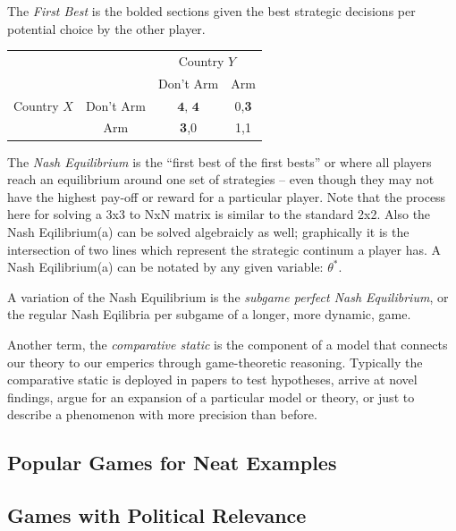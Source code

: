\documentclass[12pt]{article}\usepackage[]{graphicx}\usepackage[]{color}
\begin{document}
\begin{flushleft}
The \textit{First Best} is the bolded sections given the best strategic decisions per potential choice by the other player.


  \begin{table}[h!] %
  \centering        %
    \setlength{\extrarowheight}{2pt}
    \begin{tabular}{cc|c|c|}
      & \multicolumn{1}{c}{} & \multicolumn{2}{c}{Country $Y$}\\
      & \multicolumn{1}{c}{} & \multicolumn{1}{c}{Don't Arm}  & \multicolumn{1}{c}{Arm} \\\cline{3-4}
      {Country $X$}  & Don't Arm & $\textbf{4, 4} $ & 0,\textbf{3} \\\cline{3-4}
      & Arm & \textbf{3},0 & 1,1 \\\cline{3-4}
    \end{tabular}
  \end{table}

The \textit{Nash Equilibrium} is the ``first best of the first bests'' or where all players reach an equilibrium around one set of strategies -- even though they may not have the highest pay-off or reward for a particular player. Note that the process here for solving a 3x3 to NxN matrix is similar to the standard 2x2. Also the Nash Eqilibrium(a) can be solved algebraicly as well; graphically it is the intersection of two lines which represent the strategic continum a player has. A Nash Eqilibrium(a) can be notated by any given variable: $\theta^*$.

A variation of the Nash Equilibrium is the \textit{subgame perfect Nash Equilibrium}, or the regular Nash Eqilibria per subgame of a longer, more dynamic, game.

Another term, the \textit{comparative static} is the component of a model that connects our theory to our emperics through game-theoretic reasoning. Typically the comparative static is deployed in papers to test hypotheses, arrive at novel findings, argue for an expansion of a particular model or theory, or just to describe a phenomenon with more precision than before.


\subsection{Popular Games for Neat Examples}



\subsection{Games with Political Relevance}









\end{flushleft}
\end{document}
